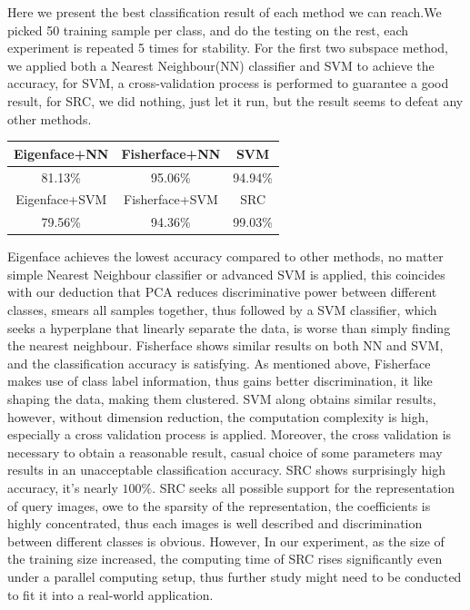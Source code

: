 \documentclass[conference]{IEEEtran}
\begin{document}
Here we present the best classification result of each method we can reach.We picked 50 training sample per class, and do the testing on the rest, each experiment is repeated 5 times for stability. For the first two subspace method, we applied both a Nearest Neighbour(NN) classifier\cite{scikit-learn} and SVM\cite{chang2011libsvm} to achieve the accuracy, for SVM, a cross-validation
process is performed to guarantee a good result, for SRC, we did nothing, just let it run, but the result seems to defeat any other methods.
\begin{center}
	\begin{tabular}{|c c c|} 
		\hline
		Eigenface+NN & Fisherface+NN & SVM  \\ 
		\hline
		 81.13\% & 95.06\% & 94.94\%  \\  
		\hline
		Eigenface+SVM & Fisherface+SVM &  SRC  \\   
		\hline
		79.56\% & 94.36\% &  99.03\%  \\
		\hline
	\end{tabular}
\end{center}

Eigenface achieves the lowest accuracy compared to other methods, no matter simple Nearest Neighbour classifier or advanced SVM is applied, this coincides with our deduction that PCA reduces discriminative power between different classes, smears all samples together, thus followed by a SVM classifier, which seeks a hyperplane that linearly separate the data, is worse than simply finding the nearest neighbour.  Fisherface shows similar results on both NN and SVM, and the classification accuracy is satisfying. As mentioned above, Fisherface makes use of class label information, thus gains better discrimination, it like shaping the data, making them clustered. SVM along obtains similar results, however, without dimension reduction, the computation complexity is high, especially a cross validation process is applied. Moreover, the cross validation is necessary to obtain a reasonable result, casual choice of some parameters may results in an unacceptable classification accuracy. SRC shows surprisingly high accuracy, it's nearly $100\%$. SRC seeks all possible support for the representation of query images, owe to the sparsity of the representation, the coefficients is highly concentrated, thus each images is well described and discrimination between different classes is obvious. However, In our experiment, as the size of the training size increased, the computing time of SRC rises significantly even under a parallel computing setup, thus further study might need to be conducted to fit it into a real-world application.
\end{document}
